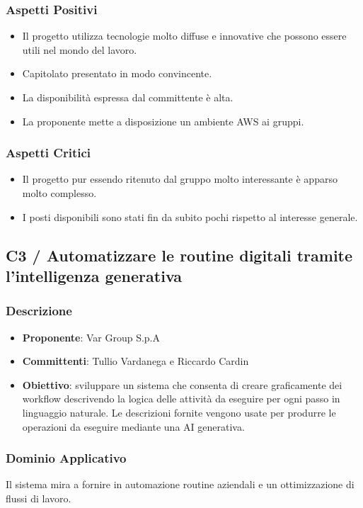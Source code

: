 \documentclass[a4paper, 12pt]{article}
\begin{document}
\subsubsection{Aspetti Positivi}
\begin{itemize}
    \item Il progetto utilizza tecnologie molto diffuse e innovative che possono essere utili nel mondo del lavoro.
    \item Capitolato presentato in modo convincente.
    \item La disponibilità espressa dal committente è alta.
    \item La proponente mette a disposizione un ambiente AWS ai gruppi.
\end{itemize}

\subsubsection{Aspetti Critici}
\begin{itemize}
    \item Il progetto pur essendo ritenuto dal gruppo molto interessante è apparso molto complesso.
    \item I posti disponibili sono stati fin da subito pochi rispetto al interesse generale.
\end{itemize}

\subsection{C3 / Automatizzare le routine digitali tramite l’intelligenza generativa}

\subsubsection{Descrizione}
\begin{itemize}
    \item \textbf{Proponente}: Var Group S.p.A
    \item \textbf{Committenti}: Tullio Vardanega e Riccardo Cardin
    \item \textbf{Obiettivo}: sviluppare un sistema che consenta di creare graficamente dei workflow descrivendo la logica delle attività da eseguire per ogni passo in linguaggio naturale.
    Le descrizioni fornite vengono usate per produrre le operazioni da eseguire mediante una AI generativa.    
\end{itemize}

\subsubsection{Dominio Applicativo}
Il sistema mira a fornire in automazione routine aziendali e un ottimizzazione di flussi di lavoro.
\end{document}
